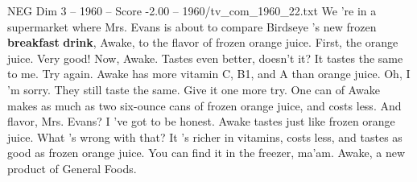 \begin{textsample}{NEG Dim 3 – 1960 – Score -2.00 – 1960/tv\_com\_1960\_22.txt}  \label{ex:f3_neg_071}
We 're in a supermarket where Mrs.
Evans is about to compare Birdseye 's new frozen \textbf{breakfast} \textbf{drink}, Awake, to the flavor of frozen orange juice.
First, the orange juice.
Very good!
Now, Awake.
Tastes even better, doesn't it?
It tastes the same to me.
Try again.
Awake has more vitamin C, B1, and A than orange juice.
Oh, I 'm sorry.
They still taste the same.
Give it one more try.
One can of Awake makes as much as two six-ounce cans of frozen orange juice, and costs less.
And flavor, Mrs.
Evans?
I 've got to be honest.
Awake tastes just like frozen orange juice.
What 's wrong with that?
It 's richer in vitamins, costs less, and tastes as good as frozen orange juice.
You can find it in the freezer, ma'am.
Awake, a new product of General Foods.

\end{textsample}
